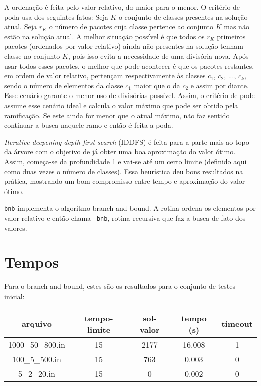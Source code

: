 \documentclass[7pt]{article}
\newcommand{\tit}[1]{\textit{#1}}
\newcommand{\ttt}[1]{\texttt{#1}}
\begin{document}
{\begin{multicols}{2}
A ordenação é feita pelo valor relativo, do maior para o menor.
O critério de poda usa dos seguintes fatos:
Seja $K$ o conjunto de classes presentes na solução atual.
Seja $r_K$ o número de pacotes cuja classe pertence ao conjunto $K$ mas não
estão na solução atual.
A melhor situação possível é que todos os $r_K$ primeiros pacotes (ordenados
por valor relativo) ainda não presentes na solução tenham classe no conjunto
$K$, pois isso evita a necessidade de uma divisória nova.
Após usar todos esses pacotes, o melhor que pode acontecer é que os pacotes
restantes, em ordem de valor relativo, pertençam respectivamente às
classes $c_1$, $c_2$, ..., $c_k$, sendo o número de elementos da classe
$c_1$ maior que o da $c_2$ e assim por diante.
Esse cenário garante o menor uso de divisórias possível.
Assim, o critério de pode assume esse cenário ideal e calcula o valor
máximo que pode ser obtido pela ramificação.
Se este ainda for menor que o atual máximo, não faz sentido continuar a
busca naquele ramo e então é feita a poda.

\tit{Iterative deepening depth-first search} (IDDFS) é feita para a parte
mais ao topo da árvore com o objetivo de já obter uma boa aproximação
do valor ótimo.
Assim, começa-se da profundidade 1 e vai-se até um certo limite
(definido aqui como duas vezes o número de classes).
Essa heurística deu bons resultados na prática, mostrando um bom compromisso
entre tempo e aproximação do valor ótimo.

\ttt{bnb} implementa o algoritmo branch and bound. A rotina ordena os
elementos por valor relativo e então chama \ttt{\_bnb}, rotina recursiva que
faz a busca de fato dos valores.

\section{Tempos}
Para o branch and bound, estes são os resultados para o conjunto de
testes inicial:
\begin{table}[H]
\centering
\setlength{\tabcolsep}{.16667em}
\begin{tabular}{|c|c|c|c|c|}
	\hline
    arquivo & tempo-limite & sol-valor & tempo (s) & timeout\\
    \hline
    1000\_50\_800.in & 15 & 2177 & 16.008 & 1\\
    \hline
    100\_5\_500.in & 15 & 763 & 0.003 & 0\\
    \hline
    5\_2\_20.in & 15 & 0 & 0.002 & 0\\
    \hline
\end{tabular}
\end{table}


\end{multicols}}
\end{document}
